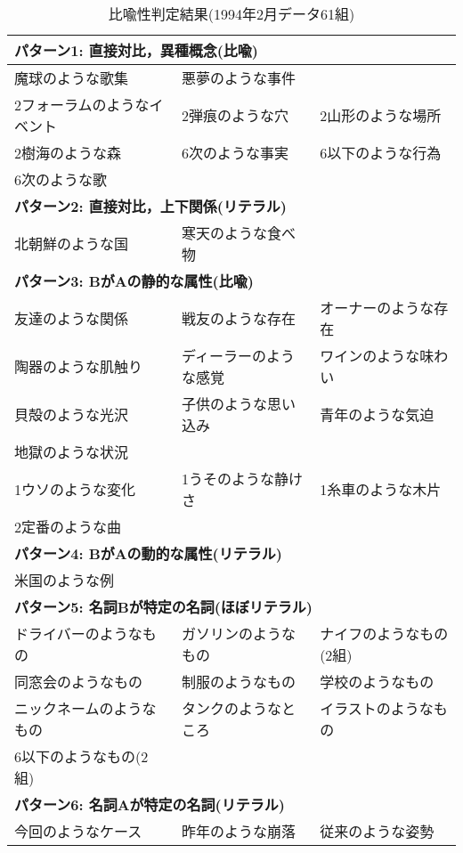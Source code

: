 \begin{table}[htbp]
	\caption{比喩性判定結果(1994年2月データ61組)}
	\begin{center}
	\begin{small}
	\begin{tabular}{|lll|}
		\hline
		\multicolumn{3}{|l|}{{\bf パターン1: 直接対比，異種概念(比喩)}} \\
		\hline
		魔球のような歌集 & 悪夢のような事件 & \\
		\hline
		2フォーラムのようなイベント & 2弾痕のような穴 & 2山形のような場所 \\
		2樹海のような森 & 6次のような事実 & 6以下のような行為 \\
		6次のような歌 & & \\
		\hline
		\hline
		\multicolumn{3}{|l|}{{\bf パターン2: 直接対比，上下関係(リテラル)}} \\
		\hline
		北朝鮮のような国 & 寒天のような食べ物 & \\
		\hline
		\hline
		\multicolumn{3}{|l|}{{\bf パターン3: BがAの静的な属性(比喩)}} \\
		\hline
		友達のような関係 & 戦友のような存在 & オーナーのような存在 \\
		陶器のような肌触り & ディーラーのような感覚 & ワインのような味わい \\
		貝殻のような光沢 & 子供のような思い込み & 青年のような気迫 \\
		地獄のような状況 & & \\
		\hline
		1ウソのような変化 & 1うそのような静けさ & 1糸車のような木片 \\
		2定番のような曲 & & \\
		\hline
		\hline
		\multicolumn{3}{|l|}{{\bf パターン4: BがAの動的な属性(リテラル)}} \\
		\hline
		米国のような例 & & \\
		\hline
		\hline
		\multicolumn{3}{|l|}{{\bf パターン5: 名詞Bが特定の名詞(ほぼリテラル)}} \\
		\hline
		ドライバーのようなもの & ガソリンのようなもの & ナイフのようなもの(2組) \\
		同窓会のようなもの & 制服のようなもの & 学校のようなもの \\
		ニックネームのようなもの & タンクのようなところ & イラストのようなもの \\
		\hline
		6以下のようなもの(2組) & & \\
		\hline
		\hline
		\multicolumn{3}{|l|}{{\bf パターン6: 名詞Aが特定の名詞(リテラル)}} \\
		\hline
		今回のようなケース & 昨年のような崩落 & 従来のような姿勢 \\

\end{tabular}
\end{small}
\end{center}
\end{table}
